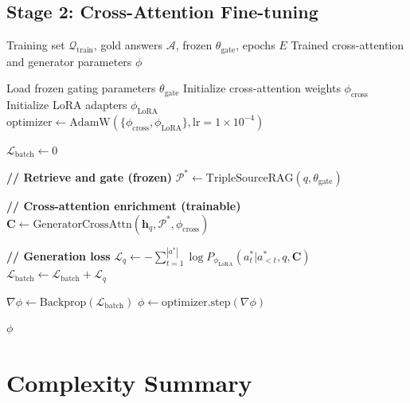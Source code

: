 \documentclass[11pt]{article}
\begin{document}
\subsection{Stage 2: Cross-Attention Fine-tuning}

\begin{algorithm}[H]
\caption{Stage2\_CrossAttentionFinetune}
\label{alg:stage2}
\begin{algorithmic}[1]
\REQUIRE Training set $\mathcal{Q}_{\text{train}}$, gold answers $\mathcal{A}$, frozen $\theta_{\text{gate}}$, epochs $E$
\ENSURE Trained cross-attention and generator parameters $\phi$

\STATE Load frozen gating parameters $\theta_{\text{gate}}$
\STATE Initialize cross-attention weights $\phi_{\text{cross}}$
\STATE Initialize LoRA adapters $\phi_{\text{LoRA}}$
\STATE $\text{optimizer} \leftarrow \text{AdamW}(\{\phi_{\text{cross}}, \phi_{\text{LoRA}}\}, \text{lr}=1 \times 10^{-4})$

        \STATE $\mathcal{L}_{\text{batch}} \leftarrow 0$
        
            \STATE \textbf{// Retrieve and gate (frozen)}
            \STATE $\mathcal{P}^* \leftarrow \text{TripleSourceRAG}(q, \theta_{\text{gate}})$
            
            \STATE \textbf{// Cross-attention enrichment (trainable)}
            \STATE $\mathbf{C} \leftarrow \text{GeneratorCrossAttn}(\mathbf{h}_q, \mathcal{P}^*, \phi_{\text{cross}})$
            
            \STATE \textbf{// Generation loss}
            \STATE $\mathcal{L}_q \leftarrow -\sum_{t=1}^{|a^*|} \log P_{\phi_{\text{LoRA}}}(a^*_t | a^*_{<t}, q, \mathbf{C})$
            \STATE $\mathcal{L}_{\text{batch}} \leftarrow \mathcal{L}_{\text{batch}} + \mathcal{L}_q$
        \ENDFOR
        
        \STATE $\nabla\phi \leftarrow \text{Backprop}(\mathcal{L}_{\text{batch}})$
        \STATE $\phi \leftarrow \text{optimizer.step}(\nabla\phi)$
    \ENDFOR
\ENDFOR

\RETURN $\phi$
\end{algorithmic}
\end{algorithm}

\section{Complexity Summary}
\end{document}
